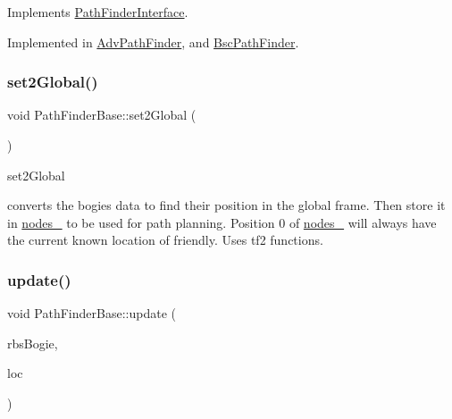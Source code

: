 Implements \hyperlink{classPathFinderInterface_adb55c9eab1ef3c4c1374c9d4313631de}{Path\+Finder\+Interface}.



Implemented in \hyperlink{classAdvPathFinder_a4abff5170d4b63a4fa98262d90e14f32}{Adv\+Path\+Finder}, and \hyperlink{classBscPathFinder_abbcde7b0e482fdc4f3fb1428c88bccb5}{Bsc\+Path\+Finder}.

\mbox{\label{classPathFinderBase_a2091af56120dbf598b826e10f0d54fac}} 
\subsubsection{\texorpdfstring{set2\+Global()}{set2Global()}}
{\footnotesize\ttfamily void Path\+Finder\+Base\+::set2\+Global (\begin{DoxyParamCaption}{ }\end{DoxyParamCaption})\hspace{0.3cm}{\ttfamily [protected]}}



set2\+Global 

converts the bogies data to find their position in the global frame. Then store it in \hyperlink{classPathFinderBase_aa93e42466b581a5455c82ac9da44dc70}{nodes\+\_\+} to be used for path planning. Position 0 of \hyperlink{classPathFinderBase_aa93e42466b581a5455c82ac9da44dc70}{nodes\+\_\+} will always have the current known location of friendly. Uses tf2 functions. \mbox{\label{classPathFinderBase_a7ab8a19a0247b66e5636e29194e5fadd}} 
\subsubsection{\texorpdfstring{update()}{update()}}
{\footnotesize\ttfamily void Path\+Finder\+Base\+::update (\begin{DoxyParamCaption}\item[{std\+::vector$<$ geometry\+\_\+msgs\+::\+Range\+Bearing\+Stamped $>$}]{rbs\+Bogie,  }\item[{geometry\+\_\+msgs\+::\+Pose}]{loc }\end{DoxyParamCaption})\hspace{0.3cm}{\ttfamily [virtual]}}



